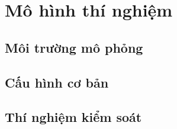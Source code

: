 \chapter{Mô hình thí nghiệm}
\section{Môi trường mô phỏng}
\section{Cấu hình cơ bản}
\section{Thí nghiệm kiểm soát}
